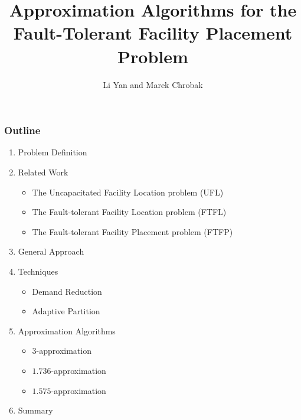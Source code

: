 \documentclass[handout, hyperref, xcolor=dvipsnames]{beamer}
\title[FTFP]{Approximation Algorithms
  for the Fault-Tolerant Facility Placement Problem}
\author[lyan,marek]{Li Yan and Marek Chrobak}
\institute[UCR]{
  Computer Science\\
  University of California Riverside\\
}
\date{}
\begin{document}
\begin{frame}
  \titlepage
\end{frame}

\begin{frame}
  \frametitle{Outline}
  \begin{enumerate}

  \item Problem Definition

  \item Related Work
    \begin{itemize}
    \item The Uncapacitated Facility Location problem (UFL)
    \item The Fault-tolerant Facility Location problem (FTFL)
    \item The Fault-tolerant Facility Placement problem (FTFP)
    \end{itemize}

  \item General Approach

  \item Techniques
    \begin{itemize}
    \item Demand Reduction
    \item Adaptive Partition
    \end{itemize}

  \item Approximation Algorithms
      \begin{itemize}
        \item $3$-approximation
        \item $1.736$-approximation
        \item $1.575$-approximation
        \end{itemize}

  \item{Summary}
  \end{enumerate}
\end{frame}
\end{document}
